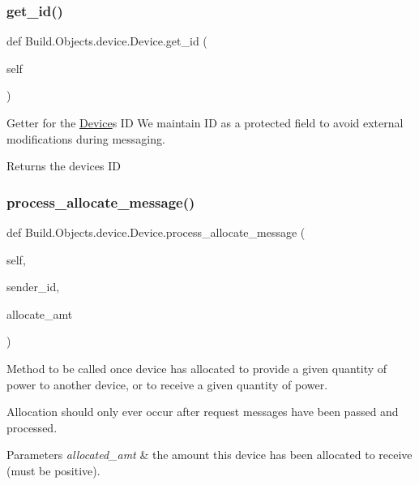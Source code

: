 \subsubsection{\texorpdfstring{get\+\_\+id()}{get\_id()}}
{\footnotesize\ttfamily def Build.\+Objects.\+device.\+Device.\+get\+\_\+id (\begin{DoxyParamCaption}\item[{}]{self }\end{DoxyParamCaption})}



Getter for the \hyperlink{class_build_1_1_objects_1_1device_1_1_device}{Device}\textquotesingle{}s ID We maintain ID as a protected field to avoid external modifications during messaging. 

\begin{DoxyReturn}{Returns}
the device\textquotesingle{}s ID 
\end{DoxyReturn}
\mbox{\label{class_build_1_1_objects_1_1device_1_1_device_af80aeef7fa18bef428cb622fc9d23d2c}} 
\subsubsection{\texorpdfstring{process\+\_\+allocate\+\_\+message()}{process\_allocate\_message()}}
{\footnotesize\ttfamily def Build.\+Objects.\+device.\+Device.\+process\+\_\+allocate\+\_\+message (\begin{DoxyParamCaption}\item[{}]{self,  }\item[{}]{sender\+\_\+id,  }\item[{}]{allocate\+\_\+amt }\end{DoxyParamCaption})}



Method to be called once device has allocated to provide a given quantity of power to another device, or to receive a given quantity of power. 

Allocation should only ever occur after request messages have been passed and processed.


\begin{DoxyParams}{Parameters}
{\em allocated\+\_\+amt} & the amount this device has been allocated to receive (must be positive). \\
\hline
\end{DoxyParams}
\mbox{\label{class_build_1_1_objects_1_1device_1_1_device_a49c8b4c3d1c3ca5cc2a070bf6761af8a}} 
